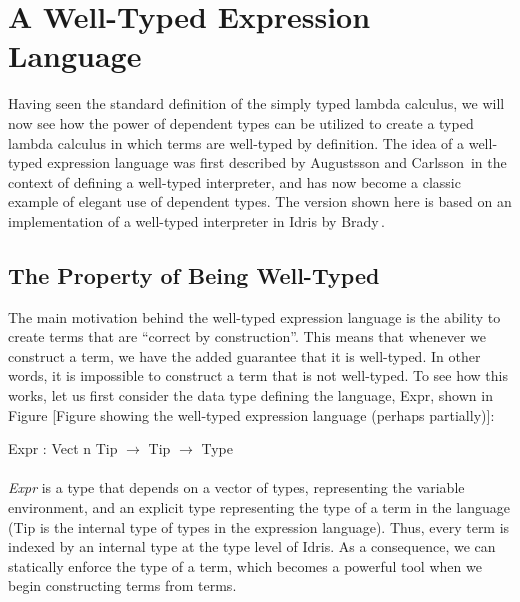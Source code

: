 \section{A Well-Typed Expression Language}
\label{sec:a-well-typed-expression-language}

Having seen the standard definition of the simply typed lambda calculus, we will now see how the power of dependent types can be utilized to create a typed lambda calculus in which terms are well-typed by definition. The idea of a well-typed expression language was first described by Augustsson and Carlsson\,\cite{Augustsson99anexercise} in the context of defining a well-typed interpreter, and has now become a classic example of elegant use of dependent types. The version shown here is based on an implementation of a well-typed interpreter in Idris by Brady\,\cite{Brady:IdrisTutorial}.

\subsection{The Property of Being Well-Typed}
The main motivation behind the well-typed expression language is the ability to create terms that are ``correct by construction''. This means that whenever we construct a term, we have the added guarantee that it is well-typed. In other words, it is impossible to construct a term that is not well-typed. To see how this works, let us first consider the data type defining the language, Expr, shown in Figure [Figure showing the well-typed expression language (perhaps partially)]:

\begin{center}
Expr : Vect n Tip $\rightarrow$ Tip $\rightarrow$ Type
\end{center}

\paragraph{}
\textit{Expr} is a type that depends on a vector of types, representing the variable environment, and an explicit type representing the type of a term in the language (Tip is the internal type of types in the expression language). Thus, every term is indexed by an internal type at the type level of Idris. As a consequence, we can statically enforce the type of a term, which becomes a powerful tool when we begin constructing terms from terms.

